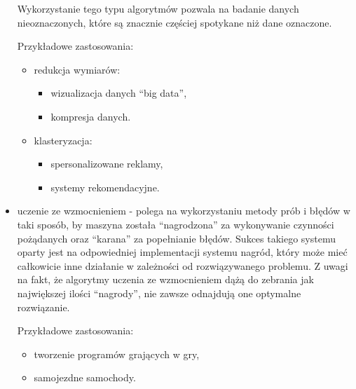 \begin{itemize}
\begin{itemize}
    \end{itemize} 
    Wykorzystanie tego typu algorytmów pozwala na badanie danych nieoznaczonych,
    które są znacznie częściej spotykane niż dane oznaczone.
    
    Przykładowe zastosowania:
    \begin{itemize}
        \item redukcja wymiarów:
        \begin{itemize}
            \item wizualizacja danych ``big data'',
            \item kompresja danych.
        \end{itemize}
        \item klasteryzacja:
        \begin{itemize}
            \item spersonalizowane reklamy,
            \item systemy rekomendacyjne.
        \end{itemize}
    \end{itemize}
    \item uczenie ze wzmocnieniem -
    polega na wykorzystaniu metody prób i błędów w taki sposób, by maszyna została
    ``nagrodzona'' za wykonywanie czynności pożądanych oraz ``karana'' za popełnianie błędów. 
    Sukces takiego systemu oparty jest na odpowiedniej implementacji systemu nagród, który może 
    mieć całkowicie inne działanie w zależności od rozwiązywanego problemu. 
    Z uwagi na fakt, że algorytmy uczenia ze wzmocnieniem dążą do zebrania jak największej
    ilości ``nagrody'', nie zawsze odnajdują one optymalne rozwiązanie.
    
    Przykładowe zastosowania:
    \begin{itemize}
        \item tworzenie programów grających w gry,
        \item samojezdne samochody.
    \end{itemize}
\end{itemize} 
\newpage
